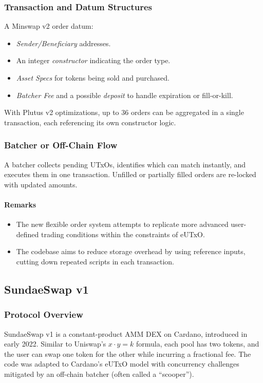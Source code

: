 \documentclass{article}
\begin{document}
\subsubsection{Transaction and Datum Structures}
A Minswap v2 order datum:
\begin{itemize}
    \item \emph{Sender/Beneficiary} addresses.
    \item An integer \emph{constructor} indicating the order type.
    \item \emph{Asset Specs} for tokens being sold and purchased.
    \item \emph{Batcher Fee} and a possible \emph{deposit} to handle expiration or fill-or-kill.
\end{itemize}
With Plutus v2 optimizations, up to 36 orders can be aggregated in a single transaction, each referencing its own constructor logic.

\subsubsection{Batcher or Off-Chain Flow}
A batcher collects pending UTxOs, identifies which can match instantly, and executes them in one transaction. Unfilled or partially filled orders are re-locked with updated amounts.

\paragraph{Remarks}
\begin{itemize}
    \item The new flexible order system attempts to replicate more advanced user-defined trading conditions within the constraints of eUTxO.
    \item The codebase aims to reduce storage overhead by using reference inputs, cutting down repeated scripts in each transaction.
\end{itemize}



\subsection{SundaeSwap v1}
\label{sec:sundae_v1}

\subsubsection{Protocol Overview}
SundaeSwap v1 is a constant-product AMM DEX on Cardano, introduced in early 2022. Similar to Uniswap’s \( x \cdot y = k \) formula, each pool has two tokens, and the user can swap one token for the other while incurring a fractional fee. The code was adapted to Cardano’s eUTxO model with concurrency challenges mitigated by an off-chain batcher (often called a ``scooper'').
\end{document}
